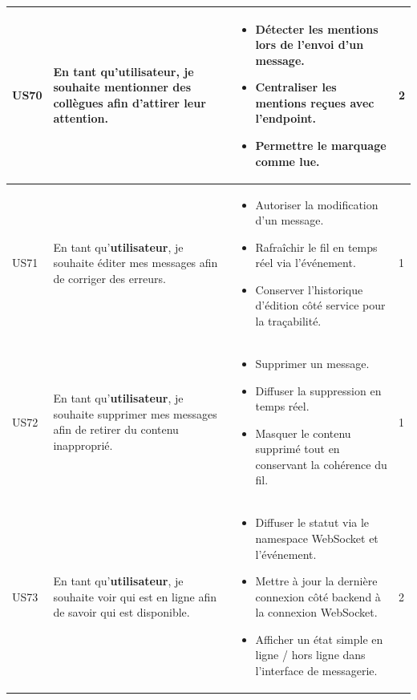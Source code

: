 \begin{longtable}{|C{1cm}|L{5.6cm}|L{8cm}|C{0.85cm}|}
US70 & En tant qu'\textbf{utilisateur}, je souhaite mentionner des collègues afin d'attirer leur attention. &
\begin{itemize}[nosep, left=0pt, label={$\bullet$}]
\item Détecter les mentions lors de l'envoi d'un message.
\item Centraliser les mentions reçues avec l'endpoint.
\item Permettre le marquage comme lue.
\end{itemize} & 2 \\
\hline

US71 & En tant qu'\textbf{utilisateur}, je souhaite éditer mes messages afin de corriger des erreurs. &
\begin{itemize}[nosep, left=0pt, label={$\bullet$}]
\item Autoriser la modification d'un message.
\item Rafraîchir le fil en temps réel via l'événement.
\item Conserver l'historique d'édition côté service pour la traçabilité.
\end{itemize} & 1 \\
\hline

US72 & En tant qu'\textbf{utilisateur}, je souhaite supprimer mes messages afin de retirer du contenu inapproprié. &
\begin{itemize}[nosep, left=0pt, label={$\bullet$}]
\item Supprimer un message.
\item Diffuser la suppression en temps réel.
\item Masquer le contenu supprimé tout en conservant la cohérence du fil.
\end{itemize} & 1 \\
\hline

US73 & En tant qu'\textbf{utilisateur}, je souhaite voir qui est en ligne afin de savoir qui est disponible. &
\begin{itemize}[nosep, left=0pt, label={$\bullet$}]
\item Diffuser le statut via le namespace WebSocket et l'événement.
\item Mettre à jour la dernière connexion côté backend à la connexion WebSocket.
\item Afficher un état simple en ligne / hors ligne dans l'interface de messagerie.
\end{itemize} & 2 \\
\hline


\end{longtable}
